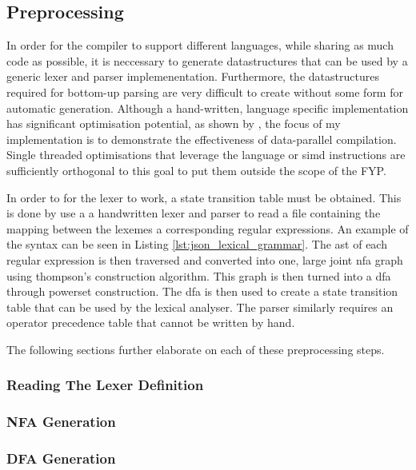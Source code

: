 \subsection{Preprocessing}

In order for the compiler to support different languages, while sharing as much code as possible,
it is neccessary to generate datastructures that can be used by a generic lexer and parser
implemenentation. Furthermore, the datastructures required for bottom-up parsing are very difficult
to create without some form for automatic generation. Although a hand-written, language specific
implementation has significant optimisation potential, as shown by \cite{langdale_parsing_2019},
the focus of my implementation is to demonstrate the effectiveness of data-parallel compilation.
Single threaded optimisations that leverage the language or \gls{simd} instructions are sufficiently
orthogonal to this goal to put them outside the scope of the FYP. 

In order to for the lexer to work, a state transition table must be obtained. This is done
by use a a handwritten lexer and parser to read a file containing the mapping between the
lexemes a corresponding regular expressions. An example of the syntax can be seen in Listing
\ref{lst:json_lexical_grammar}. The \gls{ast} of each regular expression is then traversed and
converted into one, large joint \gls{nfa} graph using thompson's construction algorithm. This graph
is then turned into a \gls{dfa} through powerset construction. The \gls{dfa} is then used to create
a state transition table that can be used by the lexical analyser. The parser similarly requires an
operator precedence table that cannot be written by hand.


The following sections further elaborate on each of these preprocessing steps.

\subsubsection{Reading The Lexer Definition}



\subsubsection{NFA Generation}

\subsubsection{DFA Generation}

